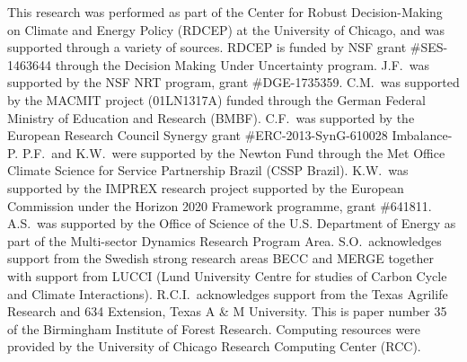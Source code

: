 \documentclass[gmd, manuscript]{copernicus} %
\begin{document}

\begin{acknowledgements}
This research was performed as part of the Center for Robust Decision-Making on Climate and Energy Policy (RDCEP) at the University of Chicago, and was supported through a variety of sources. 
RDCEP is funded by NSF grant \#SES-1463644 through the Decision Making Under Uncertainty program. 
J.F.\ was supported by the NSF NRT program, grant \#DGE-1735359. 
C.M.\ was supported by the MACMIT project (01LN1317A) funded through the German Federal Ministry of Education and Research (BMBF). 
C.F.\ was supported by the European Research Council Synergy grant \#ERC-2013-SynG-610028 Imbalance-P. 
P.F.\ and K.W.\ were supported  by the Newton Fund through the Met Office Climate Science for Service Partnership Brazil (CSSP Brazil). 
K.W.\ was supported by the IMPREX research project supported by the European Commission under the Horizon 2020 Framework programme, grant \#641811. 
A.S.\ was supported by the Office of Science of the U.S. Department of Energy as part of the Multi-sector Dynamics Research Program Area. 
S.O.\ acknowledges support from the Swedish strong research areas BECC and MERGE together with support from LUCCI (Lund University Centre for studies of Carbon Cycle and Climate Interactions). 
R.C.I.\ acknowledges support from the Texas Agrilife Research and 634 Extension, Texas A \& M University. This is paper number 35 of the Birmingham Institute of Forest Research. Computing resources were provided by the University of Chicago Research Computing Center (RCC).
\end{acknowledgements}



\end{document}
